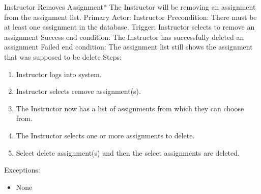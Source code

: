    \begin{section}{Instructor Removes Assignment*}
		The Instructor will be removing an assignment from the assignment list. \newline
		Primary Actor: Instructor \newline
		Precondition: There must be at least one assignment in the database. \newline
		Trigger: Instructor selects to remove an assignment \newline
		Success end condition: The Instructor has successfully deleted an assignment \newline
		Failed end condition: The assignment list still shows the assignment that was supposed to be delete \newline
		\newline
        Steps:
        \begin{enumerate}
            \item{Instructor logs into system.}
            \item{Instructor selects remove assignment(s).}
            \item{The Instructor now has a list of assignments from which they can choose from.}
            \item{The Instructor selects one or more assignments to delete.}
			\item{Select delete assignment(s) and then the select assignments are deleted.}
        \end{enumerate}
        Exceptions:
        \begin{itemize}
            \item{None}
        \end{itemize}
    \end{section}		
	

